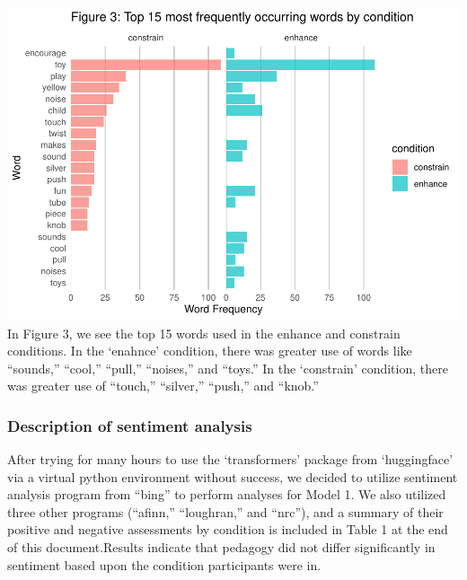 \documentclass[
  english,
  man]{apa6}
\begin{document}
\includegraphics{capstone640_files/figure-latex/unnamed-chunk-1-1.pdf}
In Figure 3, we see the top 15 words used in the enhance and constrain
conditions. In the `enahnce' condition, there was greater use of words like ``sounds,'' ``cool,'' ``pull,'' ``noises,'' and ``toys.'' In the `constrain' condition, there was greater use of ``touch,'' ``silver,'' ``push,'' and ``knob.''

\hypertarget{description-of-sentiment-analysis}{%
\subsubsection{Description of sentiment analysis}\label{description-of-sentiment-analysis}}

After trying for many hours to use the `transformers' package from `huggingface' via
a virtual python environment without success, we decided to utilize sentiment
analysis program from ``bing'' to perform analyses for Model 1. We also utilized three
other programs (``afinn,'' ``loughran,'' and ``nrc''), and a summary of their positive and
negative assessments by condition is included in Table 1 at the end of this
document.Results indicate that pedagogy did not differ significantly in sentiment based upon the condition participants were in.
\end{document}
